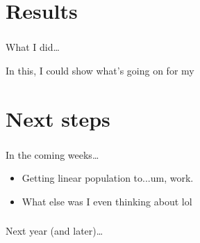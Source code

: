 \documentclass[aspectratio=169]{beamer}
\begin{document}
\section{Results}

\begin{frame} \frametitle{\insertsection}

    What I did\ldots

    In this, I could show what's going on for my 

\end{frame}

\section{Next steps}

\begin{frame} \frametitle{\insertsection}

    In the coming weeks\ldots

    \begin{itemize}
        \item{Getting linear population to...um, work.}
        \item{What else was I even thinking about lol}
    \end{itemize}

\end{frame}

\begin{frame} \frametitle{\insertsection}

    Next year (and later)\ldots

\end{frame}
\end{document}

